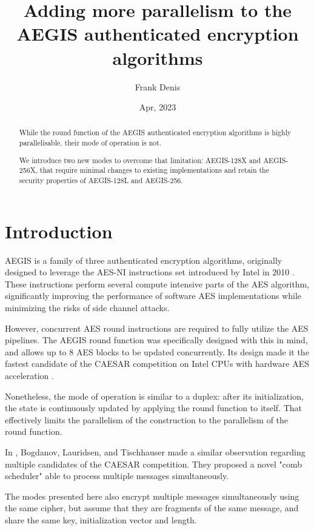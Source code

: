 \documentclass[envcountsame,runningheads,notitlepage]{llncs}
\title{Adding more parallelism to the AEGIS authenticated encryption algorithms}
\date{Apr, 2023}
\author{
  Frank Denis\inst{}
}
\institute{Fastly Inc.\\
  \href{mailto:fde@00f.net}{fde@00f.net}
}
\author{}
\institute{}
\begin{document}
\maketitle

\markboth{}{}
\graphicspath{ {images/} }

\begin{abstract}
  While the round function of the AEGIS authenticated encryption algorithms is highly parallelisable, their mode of operation is not.

  We introduce two new modes to overcome that limitation: AEGIS-128X and AEGIS-256X, that require minimal changes to existing implementations and retain the security properties of AEGIS-128L and AEGIS-256.
\end{abstract}

\section{Introduction}
\label{sec:introduction}

AEGIS \cite{SAC:WuPre13} is a family of three authenticated encryption algorithms, originally designed to leverage the AES-NI instructions set introduced by Intel in 2010 \cite{Akdemir2010BreakthroughAP}.
These instructions perform several compute intensive parts of the AES algorithm, significantly improving the performance of software AES implementations while minimizing the risks of side channel attacks.

However, concurrent AES round instructions are required to fully utilize the AES pipelines. The AEGIS round function was specifically designed with this in mind, and allows up to 8 AES blocks to be updated concurrently. Its design made it the fastest candidate of the CAESAR competition on Intel CPUs with hardware AES acceleration \cite{EPRINT:ARAR16}.

Nonetheless, the mode of operation is similar to a duplex: after its initialization, the state is continuously updated by applying the round function to itself.
That effectively limits the parallelism of the construction to the parallelism of the round function.

In \cite{FSE:BogLauTis15}, Bogdanov, Lauridsen, and Tischhauser made a similar observation regarding multiple candidates of the CAESAR competition. They proposed a novel "comb scheduler" able to process multiple messages simultaneously.

The modes presented here also encrypt multiple messages simultaneously using the same cipher, but assume that they are fragments of the same message, and share the same key, initialization vector and length.
\end{document}
